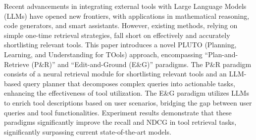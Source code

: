Recent advancements in integrating external tools with Large Language Models (LLMs) have opened new frontiers, with applications in mathematical reasoning, code generators, and smart assistants. However, existing methods, relying on simple one-time retrieval strategies, fall short on effectively and accurately shortlisting relevant tools. This paper introduces a novel PLUTO (Planning, Learning, and Understanding for TOols) approach, encompassing “Plan-and-Retrieve (P\&R)” and “Edit-and-Ground (E\&G)” paradigms. The P\&R paradigm consists of a neural retrieval module for shortlisting relevant tools and an LLM-based query planner that decomposes complex queries into actionable tasks, enhancing the effectiveness of tool utilization. The E\&G paradigm utilizes LLMs to enrich tool descriptions based on user scenarios, bridging the gap between user queries and tool functionalities. Experiment results demonstrate that these paradigms significantly improve the recall and NDCG in tool retrieval tasks, significantly surpassing current state-of-the-art models.